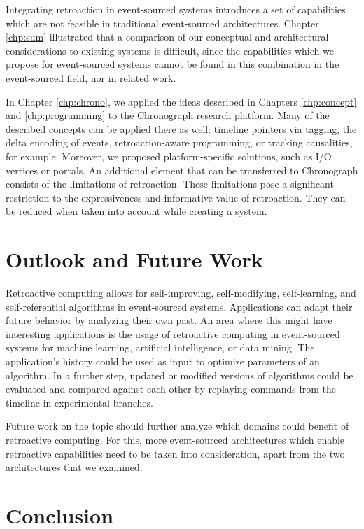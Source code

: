 Integrating retroaction in event-sourced systems introduces a set of capabilities
which are not feasible in traditional event-sourced architectures. 
Chapter \ref{chp:sum} illustrated that a comparison of our conceptual and
architectural considerations to existing systems is difficult, since the 
capabilities which we propose for event-sourced systems cannot be found in this 
combination in the event-sourced field, nor in related work.

In Chapter \ref{chp:chrono}, we applied the ideas described in Chapters \ref{chp:concept} 
and \ref{chp:programming} to the Chronograph research platform.
Many of the described concepts can be applied there as well: timeline pointers 
via tagging, the delta encoding of events, retroaction-aware programming, or 
tracking causalities, for example.
Moreover, we proposed platform-specific solutions, such as I/O vertices or portals.
%
An additional element that can be transferred to Chronograph consists of the 
limitations of retroaction. These limitations pose a significant restriction 
to the expressiveness and informative value of retroaction. They can be reduced 
when taken into account while creating a system.


\section{Outlook and Future Work}

Retroactive computing allows for self-improving, self-modifying, self-learning, 
and self-referential algorithms in event-sourced systems. 
Applications can adapt their future behavior by analyzing their own past. An area 
where this might have interesting applications is the usage of retroactive 
computing in event-sourced systems for machine learning, artificial intelligence,
or data mining. The application's history could be used as input to optimize 
parameters of an algorithm.
In a further step, updated or modified versions of algorithms could be evaluated 
and compared against each other by replaying commands from the timeline in 
experimental branches.

Future work on the topic should further analyze which domains could benefit of 
retroactive computing. For this, more event-sourced architectures which enable 
retroactive capabilities need to be taken into consideration, apart from the two 
architectures that we examined.

\pagebreak

\section{Conclusion}

